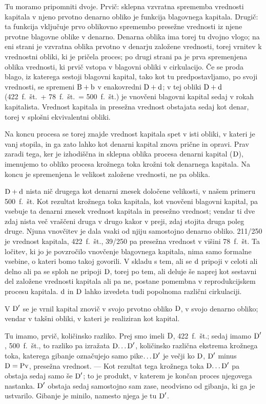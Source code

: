 \documentclass[kapital_02.tex]{subfiles}
\begin{document}
Tu moramo pripomniti dvoje. Prvič: sklepna vzvratna sprememba vrednosti kapitala v njeno prvotno denarno obliko je funkcija blagovnega kapitala. Drugič: ta funkcija vključuje prvo oblikovno spremembo presežne vrednosti iz njene prvotne blagovne oblike v denarno. Denarna oblika ima torej tu dvojno vlogo; na eni strani je vzvratna oblika prvotno v denarju založene vrednosti, torej vrnitev k vrednostni obliki, ki je pričela proces; po drugi strani pa je prva spremenjena oblika vrednosti, ki prvič vstopa v blagovni obliki v cirkulacijo. Če se proda blago, iz katerega sestoji blagovni kapital, tako kot tu predpostavljamo, po svoji vrednosti, se spremeni \( \textrm{B} + \textrm{b} \) v enakovredni \( \textrm{D} + \textrm{d} \); v tej obliki \( \textrm{D} + \textrm{d} \) (422~f.~št.\ + 78~f.~št.\ = 500~f.~št.) je vnovčeni blagovni kapital sedaj v rokah kapitalista. Vrednost kapitala in presežna vrednost obstajata sedaj kot denar, torej v splošni ekvivalentni obliki.

Na koncu procesa se torej znajde vrednost kapitala spet v isti obliki, v kateri je vanj stopila, in ga zato lahko kot denarni kapital znova prične in opravi. Prav zaradi tega, ker je izhodiščna in sklepna oblika procesa denarni kapital (\( \textrm{D} \)), imenujemo to obliko procesa krožnega toka krožni tok denarnega kapitala. Na koncu je spremenjena le velikost založene vrednosti, ne pa oblika.

\( \textrm{D} + \textrm{d} \) nista nič drugega kot denarni znesek določene velikosti, v našem primeru 500~f.~št. Kot rezultat krožnega toka kapitala, kot vnovčeni blagovni kapital, pa vsebuje ta denarni znesek vrednost kapitala in presežno vrednost; vendar ti dve zdaj nista več vraščeni druga v drugo kakor v preji, zdaj stojita druga poleg druge. Njuna vnovčitev je dala vsaki od njiju samostojno denarno obliko. 211/250 je vrednost kapitala, 422~f.~št., 39/250 pa presežna vrednost v višini 78~f.~št. Ta ločitev, ki jo je povzročilo vnovčenje blagovnega kapitala, nima samo formalne vsebine, o kateri bomo takoj govorili. V skladu s tem, ali se \( \textrm{d} \) pripoji v celoti ali delno ali pa se sploh ne pripoji \( \textrm{D} \), torej po tem, ali deluje še naprej kot sestavni del založene vrednosti kapitala ali pa ne, postane pomembna v reprodukcijskem procesu kapitala. \( \textrm{d} \) in \( \textrm{D} \) lahko izvedeta tudi popolnoma različni cirkulaciji.

V \( \textrm{D}' \) se je vrnil kapital znovič v svojo prvotno obliko \( \textrm{D} \), v svojo denarno obliko; vendar v takšni obliki, v kateri je realiziran kot kapital.

Tu imamo, prvič, količinsko razliko. Prej smo imeli \( \textrm{D} \), 422~f.~št.; sedaj imamo \( \textrm{D}' \), 500~f.~št., to razliko pa izražata \( \textrm{D}\textrm{\dots}\textrm{D}' \), količinsko različna ekstrema krožnega toka, katerega gibanje označujejo samo pike\( \textrm{\dots}\textrm{D}' \) je večji ko \( \textrm{D} \), \( \textrm{D}' \) minus \( \textrm{D} = \textrm{Pv} \), presežna vrednost. --- Kot rezultat tega krožnega toka \( \textrm{D}\textrm{\dots}\textrm{D}' \) pa obstaja sedaj samo še \( \textrm{D}' \); to je produkt, v katerem je končan proces njegovega nastanka. \( \textrm{D}' \) obstaja sedaj samostojno sam zase, neodvisno od gibanja, ki ga je ustvarilo. Gibanje je minilo, namesto njega je tu \( \textrm{D}' \).
\end{document}
